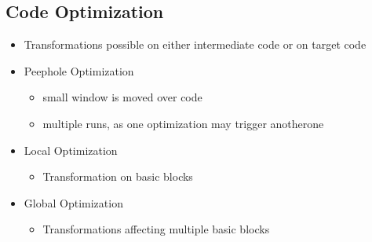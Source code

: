 \subsection{Code Optimization}
\begin{itemize}
	\item Transformations possible on either intermediate code or on target code
	\item Peephole Optimization
\begin{itemize}
	\item small window is moved over code
	\item multiple runs, as one optimization may trigger anotherone
\end{itemize}
	\item Local Optimization
\begin{itemize}
	\item Transformation on basic blocks 
\end{itemize}
	\item Global Optimization
\begin{itemize}
	\item Transformations affecting multiple basic blocks
\end{itemize}
\end{itemize}

